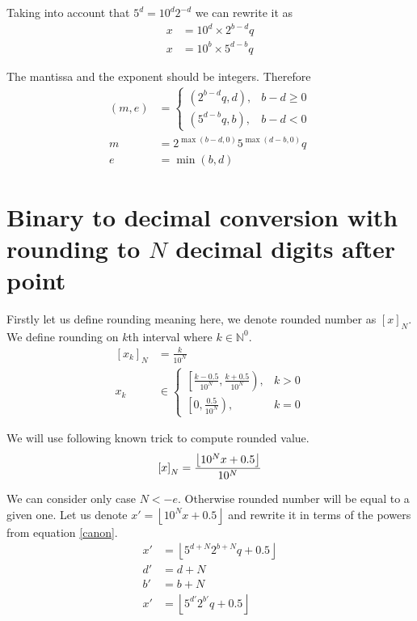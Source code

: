 \documentclass[english]{article}
\renewcommand{\geq}{\geqslant}
\begin{document}
Taking into account that $5^d = 10^d 2^{-d}$ we can rewrite it as
\begin{align}
    x & = 10^d \times 2^{b-d} q \\
    x & = 10^b \times 5^{d-b}q
\end{align}

The mantissa and the exponent should be integers. Therefore
\begin{align*}
    (m, e) & = \begin{cases}
        (2^{b-d} q, d), & b-d \geq 0 \\
        (5^{d-b} q, b), & b-d < 0
    \end{cases} \\
    m & = 2^{\max(b-d, 0)} 5^{\max(d-b, 0)} q \\
    e & = \min(b, d)
\end{align*}

\section{Binary to decimal conversion with rounding to $N$ decimal digits after point}

Firstly let us define rounding meaning here, we denote rounded number as $\left[x \right]_{N}$.
We define rounding on $k$th interval where $k \in \mathbb{N}^0$.
\begin{align*}
    \left[x_k \right]_N & = \frac{k}{10^N} \\
    x_k & \in \begin{cases}
        \left[\frac{k-0.5}{10^N}, \frac{k+0.5}{10^N} \right), & k>0 \\
        \left[0, \frac{0.5}{10^N} \right), & k=0
    \end{cases}
\end{align*}

We will use following known trick to compute rounded value.
\[
    \left[x \right]_N = \frac{\left\lfloor 10^N x + 0.5 \right\rfloor}{10^N} \\
\]

We can consider only case $N < -e$.
Otherwise rounded number will be equal to a given one.
Let us denote $x' = \left\lfloor 10^N x + 0.5 \right\rfloor$
and rewrite it in terms of the powers from equation \eqref{canon}.
\begin{align}
    x' & = \left\lfloor 5^{d+N} 2^{b+N}q + 0.5 \right\rfloor \nonumber \\
    d' & = d+N \nonumber \\
    b' & = b+N \nonumber \\
    x' & = \left\lfloor 5^{d'} 2^{b'} q + 0.5 \right\rfloor \label{x-prime}
\end{align}
\end{document}
